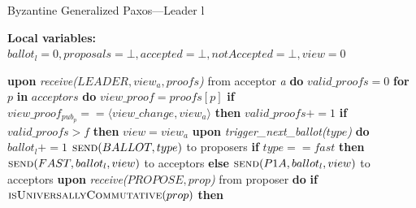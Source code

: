 \documentclass[algorithms,article,accept,moreauthors,pdftex,10pt,a4paper]{Definitions/mdpi}
\begin{document}
\begin{algorithm}[H] 
\caption{Byzantine Generalized Paxos---Leader l}
\label{BFT-Lead}
\textbf{Local variables:} $ballot_l = 0,proposals = \bot, accepted = \bot, notAccepted = \bot, view = 0$
\begin{algorithmic}[1]
\State \textbf{upon} \textit{receive($LEADER,view_a,proofs$)} from acceptor \textit{a} \textbf{do}
\State \hspace{\algorithmicindent} $valid\_proofs = 0$
\State \hspace{\algorithmicindent} \textbf{for} $p$ \textbf{in} $acceptors$ \textbf{do} 
\State \hspace{\algorithmicindent}\hspace{\algorithmicindent} $view\_proof = proofs[p]$
\State \hspace{\algorithmicindent}\hspace{\algorithmicindent} \textbf{if} $view\_proof_{pub_p} == \langle view\_change, view_a \rangle$ \textbf{then}
\State \hspace{\algorithmicindent}\hspace{\algorithmicindent}\hspace{\algorithmicindent} $valid\_proofs \mathrel{+{=}} 1$
\State \hspace{\algorithmicindent} \textbf{if} $valid\_proofs > f$ \textbf{then}
\State \hspace{\algorithmicindent}\hspace{\algorithmicindent} $view = view_a$
\State
\State \textbf{upon} \textit{trigger\_next\_ballot($type$)} \textbf{do}
\State \hspace{\algorithmicindent} $ballot_l \mathrel{+{=}} 1$
\State \hspace{\algorithmicindent} $\Call{send}{BALLOT,type}$ to proposers
\State \hspace{\algorithmicindent} \textbf{if} $type == fast$ \textbf{then}
\State \hspace{\algorithmicindent}\hspace{\algorithmicindent} $\Call{send}{FAST,ballot_l,view}$ to acceptors
\State \hspace{\algorithmicindent} \textbf{else}
\State \hspace{\algorithmicindent}\hspace{\algorithmicindent} $\Call{send}{P1A, ballot_l, view}$ to acceptors
\State
\State \textbf{upon} \textit{receive($PROPOSE, prop$)} from proposer \textbf{do} 
\State \hspace{\algorithmicindent} \textbf{if} $\Call{isUniversallyCommutative}{prop}$ \textbf{then}

\end{algorithmic}
\end{algorithm}
\end{document}
